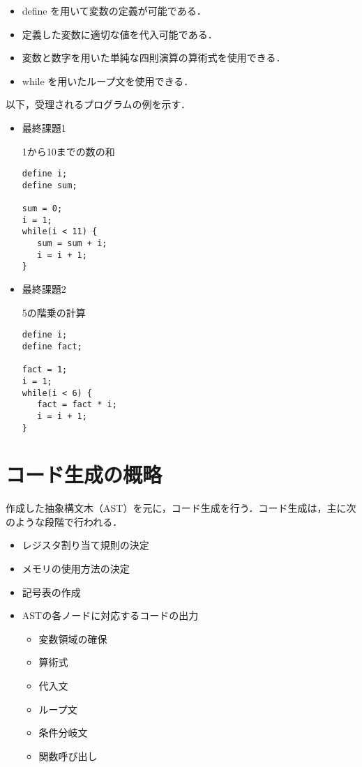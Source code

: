 \documentclass[a4j]{jarticle}
\begin{document}
\begin{screen}
\begin{itemize}
\item define を用いて変数の定義が可能である．
\item 定義した変数に適切な値を代入可能である．
\item 変数と数字を用いた単純な四則演算の算術式を使用できる．
\item while を用いたループ文を使用できる．
\end{itemize}
\end{screen}

以下，受理されるプログラムの例を示す．

\begin{itemize}


\item 最終課題1

1から10までの数の和
\begin{verbatim}
define i;
define sum;

sum = 0;
i = 1;
while(i < 11) {
   sum = sum + i;
   i = i + 1;
}
\end{verbatim}

\item 最終課題2

5の階乗の計算
\begin{verbatim}
define i;
define fact;

fact = 1;
i = 1;
while(i < 6) {
   fact = fact * i;
   i = i + 1;
}
\end{verbatim}

\end{itemize}

\section{コード生成の概略}

作成した抽象構文木（AST）を元に，コード生成を行う．コード生成は，主に次のような段階で行われる．
\begin{itemize}

\item レジスタ割り当て規則の決定
\item メモリの使用方法の決定
\item 記号表の作成
\item ASTの各ノードに対応するコードの出力
	\begin{itemize}
	\item 変数領域の確保
	\item 算術式
	\item 代入文
	\item ループ文
	\item 条件分岐文
	\item 関数呼び出し
	\end{itemize}
\end{itemize}
\end{document}
